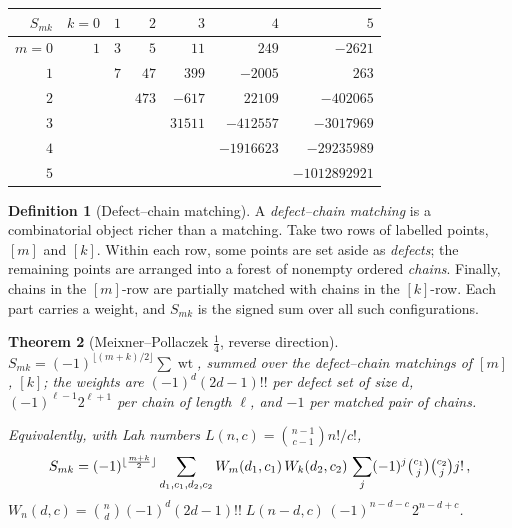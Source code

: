 \documentclass[11pt,a4paper]{article}
\newtheorem{theorem}{Theorem}[section]
\theoremstyle{definition}
\newtheorem{definition}[theorem]{Definition}
\begin{document}
\begin{tcolorbox}[colback=black!5, colframe=black!5, boxrule=0pt, sharp corners]
\begin{center}
\begin{tabular}{r|rrrrrr}
$S_{mk}$ & $k=0$ & $1$ & $2$ & $3$ & $4$ & $5$ \\
\hline
$m=0$ & $1$ & $3$ & $5$ & $11$ & $249$ & $-2621$ \\
$1$ &  & $7$ & $47$ & $399$ & $-2005$ & $263$ \\
$2$ &  &  & $473$ & $-617$ & $22109$ & $-402065$ \\
$3$ &  &  &  & $31511$ & $-412557$ & $-3017969$ \\
$4$ &  &  &  &  & $-1916623$ & $-29235989$ \\
$5$ &  &  &  &  &  & $-1012892921$ \\
\end{tabular}
\end{center}
\end{tcolorbox}

\begin{tcolorbox}[colback=green!8, colframe=green!8, boxrule=0pt, sharp corners]
\begin{definition}[Defect--chain matching]\label{def:defect-chain}
A \emph{defect--chain matching} is a combinatorial object richer
than a matching. Take two rows of labelled points, $[m]$ and $[k]$.
Within each row, some points are set aside as \emph{defects}; the
remaining points are arranged into a forest of nonempty ordered
\emph{chains}. Finally, chains in the $[m]$-row are partially matched
with chains in the $[k]$-row. Each part carries a weight, and
$S_{mk}$ is the signed sum over all such configurations.
\end{definition}
\end{tcolorbox}

\begin{tcolorbox}[colback=blue!5, colframe=blue!5, boxrule=0pt, sharp corners]
\begin{theorem}[Meixner--Pollaczek $\tfrac14$, reverse direction]\label{thm:mp}
$S_{mk} = (-1)^{\lfloor (m+k)/2 \rfloor} \sum \operatorname{wt}$,
summed over the defect--chain matchings of $[m]$, $[k]$; the
weights are $(-1)^d (2d-1)!!$ per defect set of size $d$,
$(-1)^{\ell-1} 2^{\ell+1}$ per chain of length $\ell$, and $-1$ per
matched pair of chains.

Equivalently, with Lah numbers
$L(n,c) = \binom{n-1}{c-1} n!/c!$,
\[
  S_{mk} = (-1)^{\lfloor \frac{m+k}{2} \rfloor}
  \sum_{d_1, c_1, d_2, c_2}
  W_m(d_1, c_1)\, W_k(d_2, c_2)\,
  \sum_j (-1)^j \tbinom{c_1}{j}\tbinom{c_2}{j} j! \,,
\]
$W_n(d,c) = \binom{n}{d}(-1)^d (2d-1)!!\; L(n{-}d, c)\,
(-1)^{n-d-c}\, 2^{n-d+c}$.
\end{theorem}
\end{tcolorbox}
\end{document}
